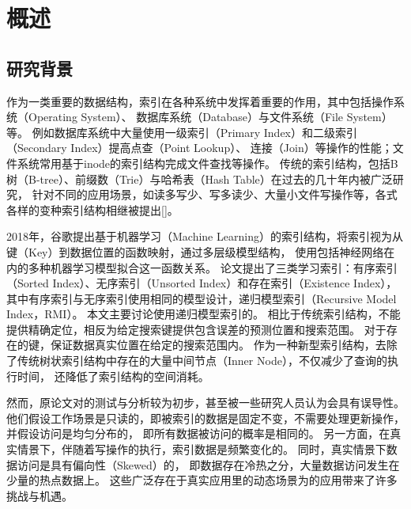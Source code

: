 
\chapter{概述}
\label{chap:intro}

\section{研究背景}

作为一类重要的数据结构，索引在各种系统中发挥着重要的作用，其中包括操作系统（Operating System）、
数据库系统（Database）与文件系统（File System）等。
例如数据库系统中大量使用一级索引（Primary Index）和二级索引（Secondary Index）提高点查（Point Lookup）、
连接（Join）等操作的性能；文件系统常用基于inode的索引结构完成文件查找等操作。
传统的索引结构，包括B树（B-tree）、前缀数（Trie）与哈希表（Hash Table）在过去的几〸年内被广泛研究，
针对不同的应用场景，如读多写少、写多读少、大量小文件写操作等，各式各样的变种索引结构相继被提出[]。

2018年，谷歌提出基于机器学习（Machine Learning）的索引结构\cite{kraska2018case}，将索引视为从键（Key）到数据位置的函数映射，通过多层级模型结构，
使用包括神经网络在内的多种机器学习模型拟合这一函数关系。
论文提出了三类学习索引：有序索引（Sorted Index）、无序索引（Unsorted Index）和存在索引（Existence Index），
其中有序索引与无序索引使用相同的模型设计，递归模型索引（Recursive Model Index，RMI）。
本文主要讨论使用递归模型索引的{\li}。
相比于传统索引结构，{\li}不能提供精确定位，相反{\li}为给定搜索键提供包含误差的预测位置和搜索范围。
对于存在的键，{\li}保证数据真实位置在给定的搜索范围内。
作为一种新型索引结构，{\li}去除了传统树状索引结构中存在的大量中间节点（Inner Node），不仅减少了查询的执行时间，
还降低了索引结构的空间消耗。

然而，原论文\cite{kraska2018case}对{\li}的测试与分析较为初步，甚至被一些研究人员认为会具有误导性\cite{throwalgo}。
他们假设工作场景是只读的，即被索引的数据是固定不变，{\li}不需要处理更新操作，并假设访问是均匀分布的，
即所有数据被访问的概率是相同的。
另一方面，在真实情景下，伴随着写操作的执行，索引数据是频繁变化的\cite{tpcc}。
同时，真实情景下数据访问是具有偏向性（Skewed）的\cite{zhang2016reducing, debrabant2013anti, eldawy2014trekking, levandoski2013identifying}，
即数据存在冷热之分，大量数据访问发生在少量的热点数据上。
这些广泛存在于真实应用里的动态场景为{\li}的应用带来了许多挑战与机遇。

